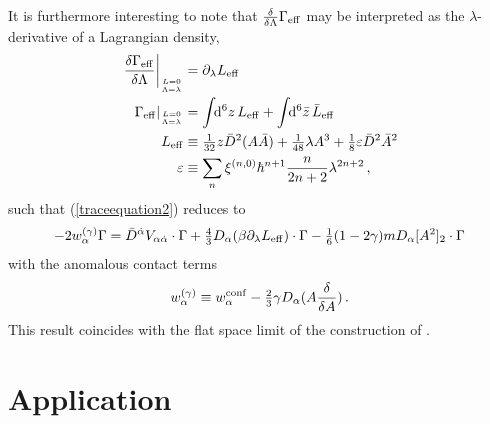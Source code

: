 \documentclass[a4paper,12pt]{article}
\def\pr{\partial}
\newcommand{\dS}{\!\!{\rm d}^6z\,}
\newcommand{\dSb}{\!\!{\rm d}^6\bar z\,}
\newcommand{\Leff}{L_{\rm eff}}
\newcommand{\Leffb}{\bar L_{\rm eff}}
\newcommand{\Geff}{\Gamma_{\rm eff}}
\newcommand{\al}{\alpha}
\newcommand{\da}{{\dot\alpha}}
\newcommand{\eps}{\varepsilon}
\newcommand{\tfr}[2]{{\textstyle \frac{#1}{#2}}}
\newcommand{\fdq}[2]{\frac{\delta #1}{\delta #2}}
\begin{document}
It is furthermore interesting to note that $\fdq{}{\Lambda}\Geff$ may be
interpreted as the $\lambda$-derivative of a Lagrangian density,
\begin{align}
\left.\fdq{\Geff}{\Lambda}\right|_{L=0 \atop \Lambda=\lambda} &=
\pr_\lambda \Leff\\ 
\left.\Geff\right|_{L=0 \atop \Lambda=\lambda} &= \int \dS \Leff + \int
\dSb \Leffb \\
\Leff &\equiv \tfr{1}{32} z \bar D^2 (A\bar A) + \tfr{1}{48} \lambda A^3 
+ \tfr{1}{8} \eps \bar D^2 \bar A^2 \\
\eps &\equiv \sum_n \xi^{(n,0)} \hbar^{n+1} \frac{n}{2n+2} \lambda^{2n+2}\,,
\end{align}
such that (\ref{traceequation2}) reduces to
\begin{equation}
-2 w_\al^{(\gamma)} \Gamma = \bar D^\da   V_{\al\da} \cdot \Gamma
+ \tfr{4}{3} D_\al ( \beta \pr_\lambda \Leff)  \cdot \Gamma 
-\tfr{1}{6} (1-2\gamma) m D_\al [A^2]_2\cdot\Gamma
\end{equation}
with the anomalous contact terms
\begin{equation}
w_\al^{(\gamma)} \equiv w_\al^{\rm conf} -\tfr{2}{3} \gamma D_\al(A
\fdq{}{A})
\,.
\end{equation}
This result coincides with the flat space limit of the construction of
\cite{ERS1}. 

\section{Application}
\setcounter{equation}{0}
\end{document}
